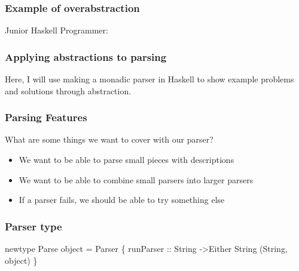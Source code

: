 \documentclass{beamer}
\begin{document}
\begin{frame}
\frametitle{Example of overabstraction}
Junior Haskell Programmer:










\end{frame}


\begin{frame}
\frametitle{Applying abstractions to parsing}
  Here, I will use making a monadic parser in Haskell 
  to show example problems and solutions through abstraction.
\end{frame}


\begin{frame}
\frametitle{Parsing Features}
  What are some things we want to cover with our parser?
  \begin{itemize}
    \item We want to be able to parse small pieces with descriptions
    \item We want to be able to combine small parsers into larger parsers
    \item If a parser fails, we should be able to try something else
  \end{itemize}
\end{frame}


\begin{frame}
\frametitle{Parser type}
  newtype Parse object = Parser \{ runParser :: String ->Either String (String, object) \}

\end{frame}
\end{document}
